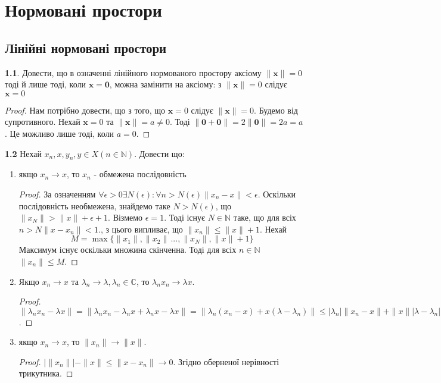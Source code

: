 \documentclass[a4paper,12pt,twoside]{book}
\begin{document}
\chapter{Нормовані простори}
\section{Лінійні нормовані простори}
\textbf{1.1}. Довести, що в означенні лінійного нормованого простору аксіому $\|\mathbf{x}\| = 0$ тоді й лише тоді, коли $\mathbf{x} = \mathbf{0}$, можна замінити на аксіому: з $\|\mathbf{x}\| = 0$ слідує $\mathbf{x} = 0$
\begin{proof}
    Нам потрібно довести, що з того, що $\mathbf{x} = 0$ слідує $\|\mathbf{x}\| = 0$. Будемо від супротивного. Нехай $\mathbf{x} = 0$ та $\|\mathbf{x}\| = a \neq 0$. Тоді $\|\mathbf{0} + \mathbf{0}\| = 2\|\mathbf{0}\|  = 2a = a $. Це можливо лише тоді, коли $a = 0$.
\end{proof}
\textbf{1.2} Нехай $x_n, x, y_n, y \in X (n \in \mathbb{N})$. Довести що:
\begin{enumerate}
    \item якщо $x_n \rightarrow x$, то $x_n$ - обмежена послідовність
    \begin{proof}
        За означенням $\forall \epsilon > 0 \exists N(\epsilon): \forall n > N(\epsilon) \|x_n - x\| < \epsilon$. Оскільки послідовність необмежена, знайдемо таке $N > N(\epsilon)$, що $\|x_N\| > \|x\| + \epsilon + 1$. Візмемо $\epsilon = 1$. Тоді існує $N \in \mathbb{N}$ таке, що для всіх $n > N \|x - x_n\| < 1.$, з цього випливає, що $\|x_n\| \leq \|x\| + 1$. Нехай
        \begin{equation}
            M = \max \{\|x_1\|,\|x_2\|\, ..., \|x_N\|, \|x\| + 1\}
        \end{equation}
    Максимум існує оскільки множина скінченна. Тоді для всіх $n \in \mathbb{N}$ $\|x_n\|\leq M$.
    \end{proof}
    \item Якщо $x_n \rightarrow x$ та $\lambda_n \rightarrow \lambda, \lambda_n \in \mathbb{C}$, то $\lambda_n x_n \rightarrow \lambda x$.
    
    \begin{proof}
      $  \|\lambda_n x_n  - \lambda x\| = \|\lambda_n x_n -\lambda_n x + \lambda_n x - \lambda x\| = \|\lambda_n (x_n - x) + x(\lambda - \lambda_n)\| \leq |\lambda_n|\|x_n - x\| + \|x\||\lambda - \lambda_n| \rightarrow 0$. 
    \end{proof}
    \item якщо $x_n \rightarrow x$, то $\|x_n\| \rightarrow \|x\|$.
    \begin{proof}
        $|\|x_n\|| - \|x\| \leq \|x - x_n\| \rightarrow 0$. Згідно оберненої нерівності трикутника.
    \end{proof}
\end{enumerate}
\end{document}
